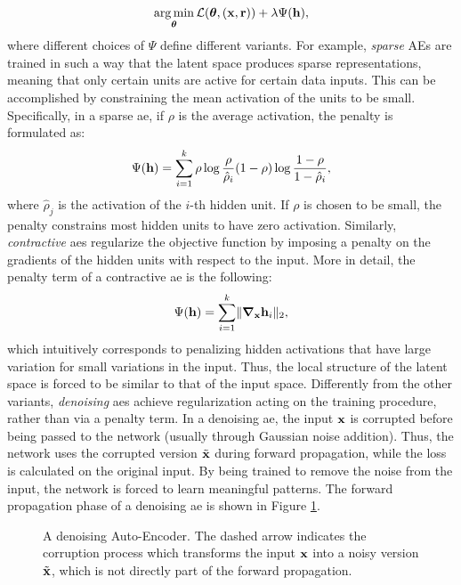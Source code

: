 $$\argmin_{\Param} \Loss(\Param, (\Vector{x}, \Vector{r})) + \lambda \Psi(\Vector{h}),$$
where different choices of $\Psi$ define different variants. For example, \emph{sparse} AEs
are trained in such a way that the latent space produces sparse representations, meaning that only certain units are active for certain data inputs. This can be accomplished by constraining the mean activation of the units to be small. Specifically, in a sparse \gls{ae}, if $\rho$ is the average activation, the penalty is formulated as:
$$\Psi(\Vector{h}) = \sum_{i=1}^k \rho \log \frac{\rho}{\hat{\rho}_i} (1 - \rho) \log \frac{1-\rho}{1-\hat{\rho}_i},$$
where $\hat{\rho}_j$ is the activation of the $i$-th hidden unit. If $\rho$ is chosen to be small, the penalty constrains most hidden units to have zero activation.
Similarly, \emph{contractive} \glspl{ae} \citep{rifai2011contractiveautoenc} regularize the objective function by imposing a penalty on the gradients of the hidden units with respect to the input. More in detail, the penalty term of a contractive \gls{ae} is the following:
$$\Psi(\Vector{h}) = \sum_{i=1}^k\norm{\grad_{\Vector{x}}\Vector{h}_i}_2,$$
which intuitively corresponds to penalizing hidden activations that have large variation for small variations in the input. Thus, the local structure of the latent space is forced to be similar to that of the input space. Differently from the other variants, \emph{denoising} \glspl{ae} \citep{vincent2010denoisingautoenc} achieve regularization acting on the training procedure, rather than via a penalty term. In a denoising \gls{ae}, the input $\Vector{x}$ is corrupted before being passed to the network (usually through Gaussian noise addition). Thus, the network uses the corrupted version $\tilde{\Vector{x}}$ during forward propagation, while the loss is calculated on the original input. By being trained to remove the noise from the input, the network is forced to learn meaningful patterns. The forward propagation phase of a denoising \gls{ae} is shown in Figure \ref{fig:denoising-ae}.
\begin{figure*}[h!]
    \centering
    \resizebox{.6\textwidth}{!}{}
    \caption{A denoising Auto-Encoder. The dashed arrow indicates the corruption process which transforms the input $\Vector{x}$ into a noisy version $\tilde{\Vector{x}}$, which is not directly part of the forward propagation.}
    \label{fig:denoising-ae}
\end{figure*}

